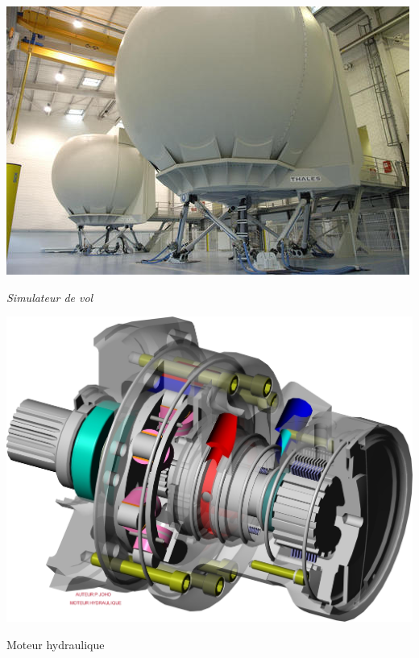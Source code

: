 \documentclass[10pt]{article}
\begin{document}
\begin{minipage}[c]{.23\linewidth}
\begin{center}
\includegraphics[width=.95\textwidth]{images/simulateur}

\textit{Simulateur de vol \cite{simulateur}}
\end{center}
\end{minipage} \hfill
\begin{minipage}[c]{.23\linewidth}
\begin{center}
\includegraphics[width=.95\textwidth]{images/MoteurHydraulique}

Moteur hydraulique \cite{mh}
\end{center}
\end{minipage} 
\end{document}
